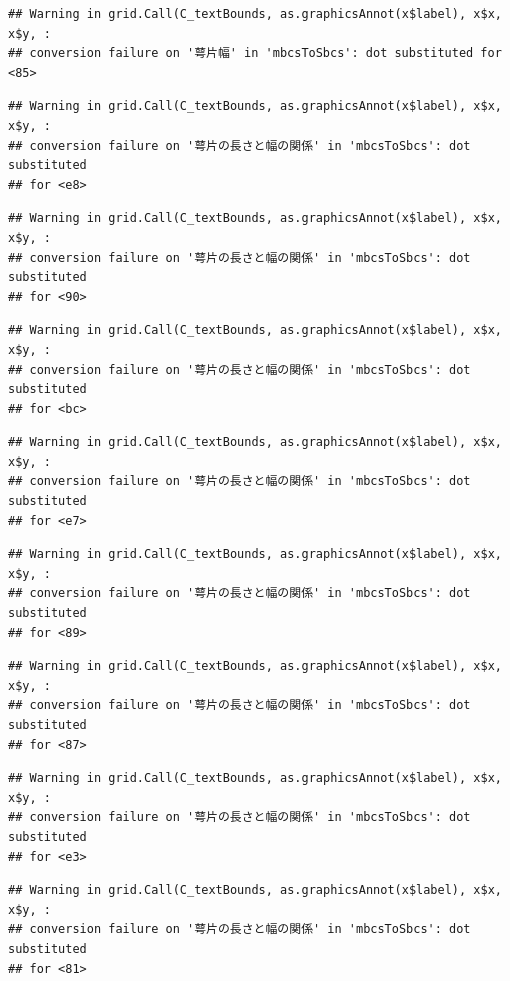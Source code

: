 \documentclass[
]{book}
\begin{document}
\begin{verbatim}
## Warning in grid.Call(C_textBounds, as.graphicsAnnot(x$label), x$x, x$y, :
## conversion failure on '萼片幅' in 'mbcsToSbcs': dot substituted for <85>
\end{verbatim}

\begin{verbatim}
## Warning in grid.Call(C_textBounds, as.graphicsAnnot(x$label), x$x, x$y, :
## conversion failure on '萼片の長さと幅の関係' in 'mbcsToSbcs': dot substituted
## for <e8>
\end{verbatim}

\begin{verbatim}
## Warning in grid.Call(C_textBounds, as.graphicsAnnot(x$label), x$x, x$y, :
## conversion failure on '萼片の長さと幅の関係' in 'mbcsToSbcs': dot substituted
## for <90>
\end{verbatim}

\begin{verbatim}
## Warning in grid.Call(C_textBounds, as.graphicsAnnot(x$label), x$x, x$y, :
## conversion failure on '萼片の長さと幅の関係' in 'mbcsToSbcs': dot substituted
## for <bc>
\end{verbatim}

\begin{verbatim}
## Warning in grid.Call(C_textBounds, as.graphicsAnnot(x$label), x$x, x$y, :
## conversion failure on '萼片の長さと幅の関係' in 'mbcsToSbcs': dot substituted
## for <e7>
\end{verbatim}

\begin{verbatim}
## Warning in grid.Call(C_textBounds, as.graphicsAnnot(x$label), x$x, x$y, :
## conversion failure on '萼片の長さと幅の関係' in 'mbcsToSbcs': dot substituted
## for <89>
\end{verbatim}

\begin{verbatim}
## Warning in grid.Call(C_textBounds, as.graphicsAnnot(x$label), x$x, x$y, :
## conversion failure on '萼片の長さと幅の関係' in 'mbcsToSbcs': dot substituted
## for <87>
\end{verbatim}

\begin{verbatim}
## Warning in grid.Call(C_textBounds, as.graphicsAnnot(x$label), x$x, x$y, :
## conversion failure on '萼片の長さと幅の関係' in 'mbcsToSbcs': dot substituted
## for <e3>
\end{verbatim}

\begin{verbatim}
## Warning in grid.Call(C_textBounds, as.graphicsAnnot(x$label), x$x, x$y, :
## conversion failure on '萼片の長さと幅の関係' in 'mbcsToSbcs': dot substituted
## for <81>
\end{verbatim}
\end{document}
